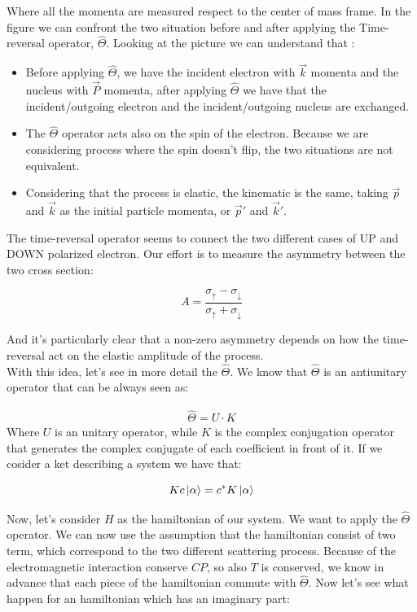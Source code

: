 Where all the momenta are measured respect to the center of mass frame. In the figure we can confront the two situation before and after applying the Time-reversal operator, $\hat{\Theta}$. Looking at the picture we can understand that : 

\begin{itemize}
\item Before applying $\hat{\Theta}$, we have the incident electron with $\vec{k}$ momenta and the nucleus with $\vec{P}$ momenta, after applying $\hat{\Theta}$ we have that the incident/outgoing electron and the incident/outgoing nucleus are exchanged.
\item The $\hat{\Theta}$ operator acts also on the spin of the electron. Because we are considering process where the spin doesn't flip, the two situations are not equivalent.
\item Considering that the process is elastic, the kinematic is the same, taking $\vec{p}$ and $\vec{k}$ as the initial particle momenta, or $\vec{p}'$ and $\vec{k}'$. 

\end{itemize}

The time-reversal operator seems to connect the two different cases of UP and DOWN polarized electron. Our effort is to measure the asymmetry between the two cross section:

\begin{equation}
A = \frac{\sigma_{\uparrow} - \sigma_{\downarrow}}{\sigma_{\uparrow} + \sigma_{\downarrow}}
\end{equation}

And it's particularly clear that a non-zero asymmetry depends on how the time-reversal act on the elastic amplitude of the process. \\
With this idea, let's see in more detail the $\hat{\Theta}$. We know that $\hat{\Theta}$ is an antiunitary operator that can be always seen as:

\begin{align*}
\hat{\Theta} = U \cdot K
\end{align*} 
Where $U$ is an unitary operator, while $K$ is the complex conjugation operator that generates the complex conjugate of each coefficient in front of it. If we cosider a ket describing a system we have that:

\begin{equation}
Kc \ket{\alpha} = c^{*} K \ket{\alpha}
\end{equation}

Now, let's consider $H$ as the hamiltonian of our system. We want to apply the $\hat{\Theta}$ operator. We can now use the assumption that the hamiltonian consist of two term, which correspond to the two different scattering process. Because of the electromagnetic interaction conserve $CP$, so also $T$ is conserved, we know in advance that each piece of the hamiltonian commute with $\hat{\Theta}$. Now let's see what happen for an hamiltonian which has an imaginary part:

